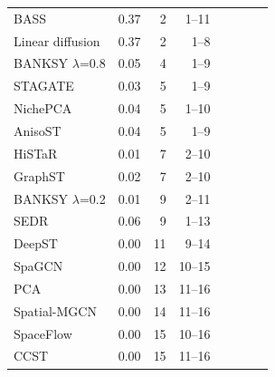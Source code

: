 \begin{tabular}{lrrrrrrl}
BASS & 0.37 & 2 & 1--11 &  &  &  &  \\
Linear diffusion & 0.37 & 2 & 1--8 &  &  &  &  \\
BANKSY $\lambda$=0.8 & 0.05 & 4 & 1--9 &  &  &  &  \\
STAGATE & 0.03 & 5 & 1--9 &  &  &  &  \\
NichePCA & 0.04 & 5 & 1--10 &  &  &  &  \\
AnisoST & 0.04 & 5 & 1--9 &  &  &  &  \\
HiSTaR & 0.01 & 7 & 2--10 &  &  &  &  \\
GraphST & 0.02 & 7 & 2--10 &  &  &  &  \\
BANKSY $\lambda$=0.2 & 0.01 & 9 & 2--11 &  &  &  &  \\
SEDR & 0.06 & 9 & 1--13 &  &  &  &  \\
DeepST & 0.00 & 11 & 9--14 &  &  &  &  \\
SpaGCN & 0.00 & 12 & 10--15 &  &  &  &  \\
PCA & 0.00 & 13 & 11--16 &  &  &  &  \\
Spatial-MGCN & 0.00 & 14 & 11--16 &  &  &  &  \\
SpaceFlow & 0.00 & 15 & 10--16 &  &  &  &  \\
CCST & 0.00 & 15 & 11--16 &  &  &  &  \\
\bottomrule
\end{tabular}
